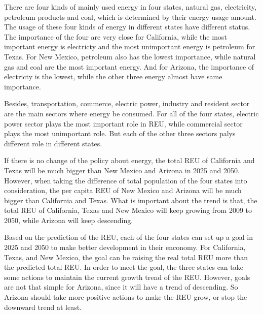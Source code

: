 \documentclass[letterpaper,11pt]{texMemo} %
\begin{document}
\maketitle %

\par There are four kinds of mainly used energy in four states, natural gas, electricity, petroleum products and coal, which is determined by their energy usage amount. The usage of these four kinds of energy in different states have different status. The importance of the four are very close for California, while the most important energy is electricty and the most unimportant energy is petroleum for Texas. For New Mexico, petroleum also has the lowest importance, while natural gas and coal are the most important energy. And for Arizona, the importance of electricty is the lowest, while the other three energy almost have same importance.
\par Besides, transportation, commerce, electric power, industry and resident sector are the main sectors where energy be consumed. For all of the four states, electric power sector plays the most important role in REU, while commercial sector plays the most unimportant role. But each of the other three sectors palys different role in different states.
\par If there is no change of the policy about energy, the total REU of California and Texas will be much bigger than New Mexico and Arizona in 2025 and 2050. However, when taking the difference of total population of the four states into consideration, the per capita REU of New Mexico and Arizona will be much bigger than California and Texas. What is important about the trend is that, the total REU of California, Texas and New Mexico will keep growing from 2009 to 2050, while Arizona will keep descending.
\par Based on the prediction of the REU, each of the four states can set up a goal in 2025 and 2050 to make better development in their enconomy. For California, Texas, and New Mexico, the goal can be raising the real total REU more than the predicted total REU. In order to meet the goal, the three states can take some actions to maintain the current growth trend of the REU. However, goals are not that simple for Arizona, since it will have a trend of descending. So Arizona should take more positive actions to make the REU grow, or stop the downward trend at least.


\end{document}
